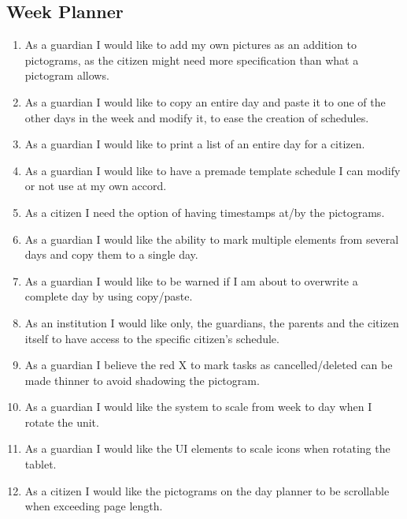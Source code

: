 \subsection*{Week Planner}
\begin{enumerate}
  \setlength\itemsep{0em}
  \item As a guardian I would like to add my own pictures as an addition to pictograms, as the citizen might need more specification than what a pictogram allows.
  \item As a guardian I would like to copy an entire day and paste it to one of the other days in the week and modify it, to ease the creation of schedules.
  \item As a guardian I would like to print a list of an entire day for a citizen.
  \item As a guardian I would like to have a premade template schedule I can modify or not use at my own accord.
  \item As a citizen I need the option of having timestamps at/by the pictograms.
  \item As a guardian I would like the ability to mark multiple elements from several days and copy them to a single day.
  \item As a guardian I would like to be warned if I am about to overwrite a complete day by using copy/paste.
  \item As an institution I would like only, the guardians, the parents and the citizen itself to have access to the specific citizen’s schedule.
  \item As a guardian I believe the red X to mark tasks as cancelled/deleted can be made thinner to avoid shadowing the pictogram.
  \item As a guardian I would like the system to scale from week to day when I rotate the unit.
  \item As a guardian I would like the UI elements to scale icons when rotating the tablet.
  \item As a citizen I would like the pictograms on the day planner to be scrollable when exceeding page length.
\end{enumerate}
